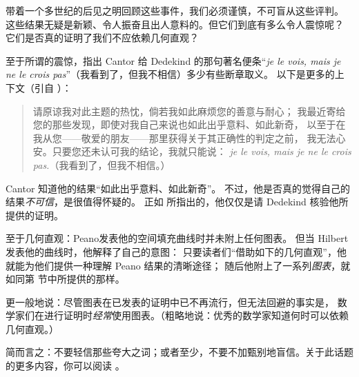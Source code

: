 \documentclass[../../../include/open-logic-section]{subfiles}
\begin{document}


带着一个多世纪的后见之明回顾这些事件，我们必须谨慎，不可盲从这些评判。
这些结果无疑是新颖、令人振奋且出人意料的。但它们到底有多么令人震惊呢？
它们是否真的证明了我们不应依赖几何直观？

至于所谓的震惊，\citet{Gouvea2011}指出 Cantor 给 Dedekind
的那句著名便条“\emph{je le vois, mais je ne le crois
pas}”（我看到了，但我不相信）多少有些断章取义。
以下是更多的上下文（引自 \citeauthor{Gouvea2011}）：

\begin{quote}
请原谅我对此主题的热忱，倘若我如此麻烦您的善意与耐心；
我最近寄给您的那些发现，即使对我自己来说也如此出乎意料、如此新奇，
以至于在我从您——敬爱的朋友——那里获得关于其正确性的判定之前，
我无法心安。只要您还未认可我的结论，我就只能说：
\emph{je le vois, mais je ne le crois pas.}（我看到了，但我不相信。）
\end{quote}

Cantor 知道他的结果“如此出乎意料、如此新奇”。
不过，他是否真的觉得自己的结果\emph{不可信}，是很值得怀疑的。
正如 \citeauthor{Gouvea2011} 所指出的，他仅仅是请 Dedekind 核验他所提供的证明。

至于几何直观：Peano发表他的空间填充曲线时并未附上任何图表。
但当 Hilbert发表他的曲线时，他解释了自己的意图：
只要读者们“借助如下的几何直观”，他就能为他们提供一种理解 Peano 结果的清晰途径；
随后他附上了一系列\emph{图表}，就如同第  节中所提供的那样。

更一般地说：尽管图表在已发表的证明中已不再流行，但无法回避的事实是，
数学家们在进行证明时\emph{经常}使用图表。（粗略地说：优秀的数学家知道何时可以依赖几何直观。）

简而言之：不要轻信那些夸大之词；或者至少，不要不加甄别地盲信。关于此话题的更多内容，你可以阅读 \citet{Giaquinto2007}。
\end{document}
